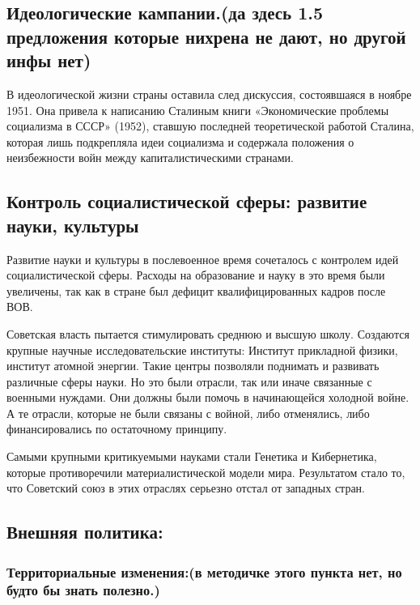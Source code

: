 \subsection{Идеологические кампании.(да здесь 1.5 предложения которые нихрена не дают, но другой инфы нет)}

В идеологической жизни страны оставила след дискуссия, состоявшаяся в ноябре 1951. Она привела к написанию Сталиным книги «Экономические проблемы социализма в СССР» (1952), ставшую последней теоретической работой Сталина, которая лишь подкрепляла идеи социализма и  содержала положения о неизбежности войн между капиталистическими странами.

\subsection{Контроль социалистической сферы: развитие науки, культуры}

Развитие науки и культуры в послевоенное время сочеталось с контролем идей социалистической сферы. Расходы на образование и науку в это время были увеличены, так как в стране был дефицит квалифицированных кадров после ВОВ. 

Советская власть пытается стимулировать среднюю и высшую школу. Создаются крупные научные исследовательские институты: Институт прикладной физики, институт атомной энергии. Такие центры позволяли поднимать и развивать различные сферы науки. Но это были отрасли, так или иначе связанные с военными нуждами. Они должны были помочь в начинающейся холодной войне. А те отрасли, которые не были связаны с войной, либо отменялись, либо финансировались по остаточному принципу. 

Самыми крупными критикуемыми науками стали Генетика и Кибернетика, которые противоречили материалистической модели мира. Результатом стало то, что Советский союз в этих отраслях серьезно отстал от западных стран.

\subsection{Внешняя политика:}

\subsubsection{\textbf{Территориальные изменения:(в методичке этого пункта нет, но будто бы знать полезно.)}}

